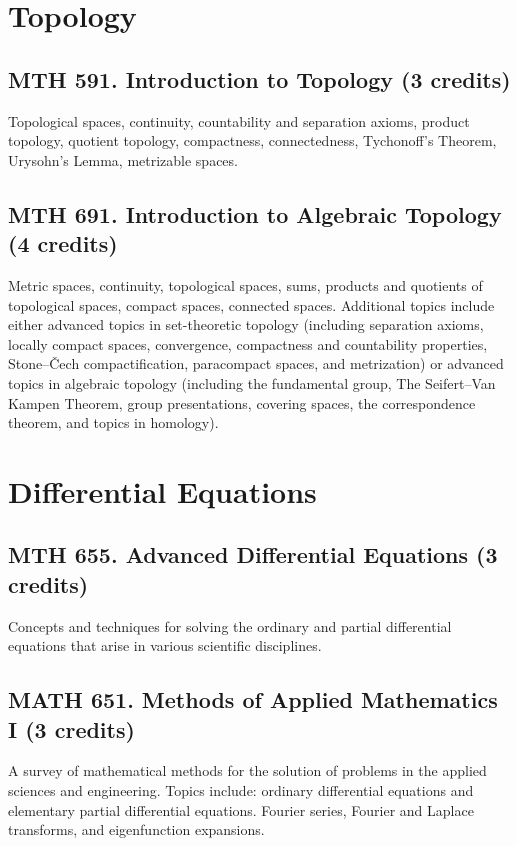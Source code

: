 \documentclass[11pt]{article}
\begin{document}
\section{Topology}

\subsection{MTH 591. Introduction to Topology \mdseries(3 credits)}
Topological spaces, continuity, countability and separation axioms, product topology, quotient topology, compactness, connectedness, Tychonoff's Theorem, Urysohn's Lemma, metrizable spaces.

\subsection{MTH 691. Introduction to Algebraic Topology \mdseries(4 credits)}
Metric spaces, continuity, topological spaces, sums, products and quotients of topological spaces, compact spaces, connected spaces. Additional topics include either advanced topics in set-theoretic topology (including separation axioms, locally compact spaces, convergence, compactness and countability properties, Stone--\v{C}ech compactification, paracompact spaces, and metrization) or advanced topics in algebraic topology (including the fundamental group, The Seifert--Van Kampen Theorem, group presentations, covering spaces, the correspondence theorem, and topics in homology).

\section{Differential Equations}

\subsection{MTH 655. Advanced Differential Equations \mdseries(3 credits)}
Concepts and techniques for solving the ordinary and partial differential equations that arise in various scientific disciplines.

\subsection{MATH 651. Methods of Applied Mathematics I \mdseries(3 credits)}
A survey of mathematical methods for the solution of problems in the applied sciences and engineering. Topics include: ordinary differential equations and elementary partial differential equations. Fourier series, Fourier and Laplace transforms, and eigenfunction expansions.
\end{document}
